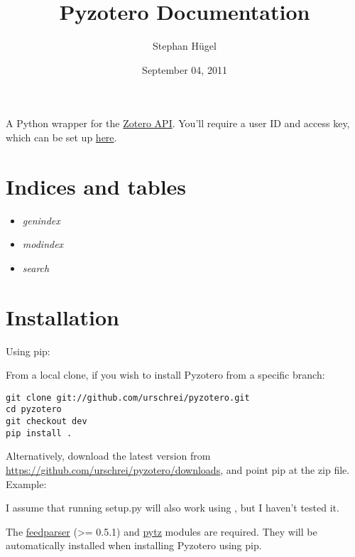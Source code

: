 \documentclass[letterpaper,10pt,english]{sphinxmanual}
\title{Pyzotero Documentation}
\date{September 04, 2011}
\author{Stephan Hügel}
\begin{document}
\maketitle
\tableofcontents
{}\label{index::doc}


A Python wrapper for the \href{http://www.zotero.org/support/dev/server\_api}{Zotero API}. You'll require a user ID and access key, which can be set up \href{http://www.zotero.org/settings/keys/new}{here}.
\label{index:module-pyzotero.zotero}

\chapter{Indices and tables}
\label{index:indices-and-tables}\label{index:description}\begin{itemize}
\item {} 
\emph{genindex}

\item {} 
\emph{modindex}

\item {} 
\emph{search}

\end{itemize}


\chapter{Installation}
\label{index:installation}
Using pip: 

From a local clone, if you wish to install Pyzotero from a specific branch:

\begin{Verbatim}[commandchars=@\[\]]
git clone git://github.com/urschrei/pyzotero.git
cd pyzotero
git checkout dev
pip install .
\end{Verbatim}

Alternatively, download the latest version from \href{https://github.com/urschrei/pyzotero/downloads}{https://github.com/urschrei/pyzotero/downloads}, and point pip at the zip file.
Example: 

I assume that running setup.py will also work using , but I haven't tested it.

The \href{http://feedparser.org}{feedparser} (\textgreater{}= 0.5.1) and \href{http://pypi.python.org/pypi/pytz/}{pytz} modules are required. They will be automatically installed when installing Pyzotero using pip.
\end{document}
